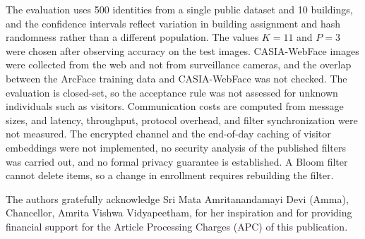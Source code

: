 \documentclass[pdflatex,sn-mathphys-num]{sn-jnl}%
\theoremstyle{thmstyleone}%
\theoremstyle{thmstyletwo}%
\theoremstyle{thmstylethree}%
\begin{document}
The evaluation uses 500 identities from a single public dataset and 10 buildings, and the confidence intervals reflect variation in building assignment and hash randomness rather than a different population. The values $K=11$ and $P=3$ were chosen after observing accuracy on the test images. CASIA-WebFace images were collected from the web and not from surveillance cameras, and the overlap between the ArcFace training data and CASIA-WebFace was not checked. The evaluation is closed-set, so the acceptance rule was not assessed for unknown individuals such as visitors. Communication costs are computed from message sizes, and latency, throughput, protocol overhead, and filter synchronization were not measured. The encrypted channel and the end-of-day caching of visitor embeddings were not implemented, no security analysis of the published filters was carried out, and no formal privacy guarantee is established. A Bloom filter cannot delete items, so a change in enrollment requires rebuilding the filter.


The authors gratefully acknowledge Sri Mata Amritanandamayi Devi (Amma), Chancellor, Amrita Vishwa Vidyapeetham, for her inspiration and for providing financial support for the Article Processing Charges (APC) of this publication.

\end{document}
